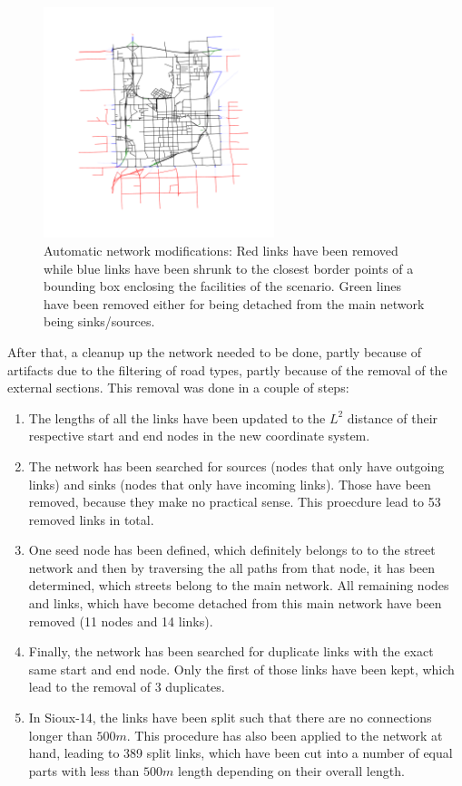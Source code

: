 \begin{figure}
    \centering
    \includegraphics[width=0.6\textwidth]{figures/sioux_step2.pdf}
    \caption{Automatic network modifications: Red links have been removed while
    blue links have been shrunk to the closest border points of a bounding box
    enclosing the facilities of the scenario. Green lines have been removed either
    for being detached from the main network being sinks/sources.}
    \label{fig:sioux_step2}
\end{figure}

After that, a cleanup up the network needed to be done, partly because of artifacts
due to the filtering of road types, partly because of the removal of the external
sections. This removal was done in a couple of steps:

\begin{enumerate}
\item The lengths of all the links have been updated to the $L^2$ distance of their
respective start and end nodes in the new coordinate system.
\item The network has been searched for sources (nodes that only have outgoing links)
and sinks (nodes that only have incoming links). Those have been removed, because they
make no practical sense. This proecdure lead to 53 removed links in total.
\item One seed node has been defined, which definitely belongs to to the street
network and then by traversing the all paths from that node, it has been determined,
which streets belong to the main network. All remaining nodes and links, which have
become detached from this main network have been removed (11 nodes and 14 links).
\item Finally, the network has been searched for duplicate links with the exact
same start and end node. Only the first of those links have been kept, which lead
to the removal of 3 duplicates.
\item In Sioux-14, the links have been split such that there are no connections
longer than $500m$. This procedure has also been applied to the network at hand,
leading to 389 split links, which have been cut into a number of equal parts
with less than $500m$ length depending on their overall length.
\end{enumerate}

